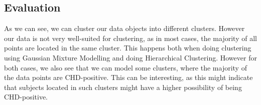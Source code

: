 \subsection{Evaluation}

As we can see, we can cluster our data objects into different clusters. However our data is not very well-suited for clustering, as in most cases, the majority of all points are located in the same cluster. This happens both when doing clustering using Gaussian Mixture Modelling and doing Hierarchical Clustering. However for both cases, we also see that we can model some clusters, where the majority of the data points are CHD-positive. This can be interesting, as this might indicate that subjects located in such clusters might have a higher possibility of being CHD-positive.